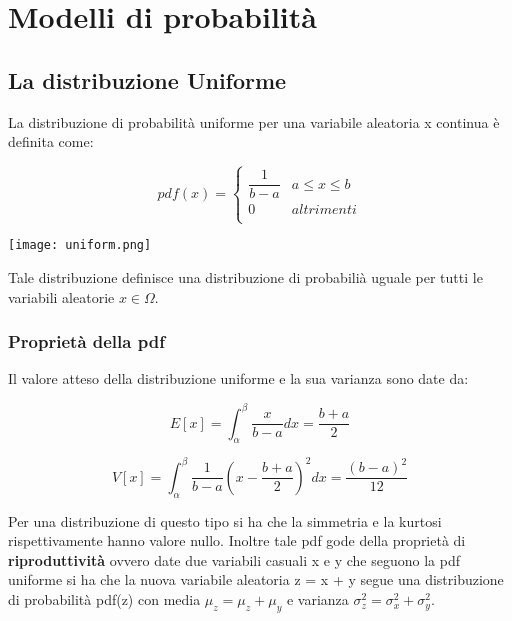 \documentclass[11pt,a4paper]{book}
\begin{document}
	
\setcounter{chapter}{1}
\chapter{Modelli di probabilit\`{a}}
	
\section{La distribuzione Uniforme}

La distribuzione di probabilit\`{a} uniforme per una variabile aleatoria x continua \`{e} definita come:
\vspace{0.3in}

  \begin{minipage}{.5\textwidth}
    \[ pdf(x) = 
	\begin{cases} 
      \dfrac{1}{b-a} & a \leq x \leq b \\
      0 & altrimenti \\ 
   \end{cases}
\]
  \end{minipage}
  \begin{minipage}{.4\textwidth}
    \centering
    \texttt{[image: uniform.png]}
 	
  \end{minipage}
\vspace{0.3in}

Tale distribuzione definisce una distribuzione di probabili\`{a} uguale per tutti le variabili aleatorie $x \in \Omega$. 

\subsection{Propriet\`{a} della pdf}
Il valore atteso della distribuzione uniforme e la sua varianza sono date da:

\begin{equation}
	E[x] = \int_{\alpha}^{\beta}{\dfrac{x}{b-a}dx} =\dfrac{b+a}{2} 
\end{equation}

\begin{equation}
	V[x] = \int_{\alpha}^{\beta}{\dfrac{1}{b-a}( x- \dfrac{b+a}{2})^2dx} = \dfrac{(b-a)^2}{12}
\end{equation}
\newline

\noindent Per una distribuzione di questo tipo si ha che la simmetria e la kurtosi rispettivamente hanno valore nullo.\newline
Inoltre tale pdf gode della propriet\`{a} di \textbf{riproduttivit\`{a}} ovvero date due variabili casuali x e y che seguono la pdf uniforme si ha che la nuova variabile aleatoria z = x + y segue una distribuzione di probabilit\`{a} pdf(z) con media $\mu_z = \mu_z + \mu_y$ e varianza $\sigma^2_z = \sigma_x^2 + \sigma_y^2$.\newline
\end{document}
